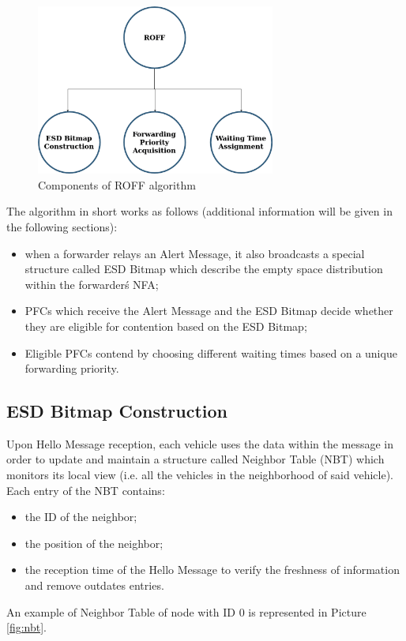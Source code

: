 		\begin{figure}[H]
			\centering
			\includegraphics[width=0.7\textwidth]{immagini/roffAlgo}
			\caption{Components of ROFF algorithm}
			\label{fig:roffAlgo}
		\end{figure}
	
		The algorithm in short works as follows (additional information will be given in the following sections):
		\begin{itemize}
			\item when a forwarder relays an Alert Message, it also broadcasts a special structure called ESD Bitmap which describe the empty space distribution within the forwarderś NFA;
			\item PFCs which receive the Alert Message and the ESD Bitmap decide whether they are eligible for contention based on the ESD Bitmap;
			\item Eligible PFCs contend by choosing different waiting times based on a unique forwarding priority.
		\end{itemize}
	
		\subsection{ESD Bitmap Construction}
			Upon Hello Message reception, each vehicle uses the data within the message in order to update and maintain a structure called Neighbor Table (NBT) which monitors its local view (i.e. all the vehicles in the neighborhood of said vehicle). Each entry of the NBT contains:
			\begin{itemize}
				\item the ID of the neighbor;
				\item the position of the neighbor;
				\item the reception time of the Hello Message to verify the freshness of information and remove outdates entries.
			\end{itemize}
			An example of Neighbor Table of node with ID 0 is represented in Picture \ref{fig:nbt}.
				
